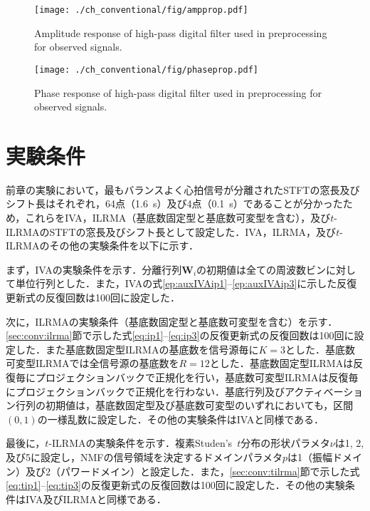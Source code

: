 \begin{figure}[!t]
\centering
\texttt{[image: ./ch\_conventional/fig/ampprop.pdf]}
\caption{Amplitude response of high-pass digital filter used in preprocessing for observed signals.}
\label{fig:ampres}
\end{figure}

\begin{figure}[!t]
\centering
\texttt{[image: ./ch\_conventional/fig/phaseprop.pdf]}
\caption{Phase response of high-pass digital filter used in preprocessing for observed signals.}
\label{fig:phaseres}
\end{figure}

\section{実験条件}
\label{sec:conv:expcond5}

前章の実験において，最もバランスよく心拍信号が分離されたSTFTの窓長及びシフト長はそれぞれ，64点（1.6~s）及び4点（0.1~s）であることが分かったため，これらをIVA，ILRMA（基底数固定型と基底数可変型を含む），及び$t$-ILRMAのSTFTの窓長及びシフト長として設定した．IVA，ILRMA，及び$t$-ILRMAのその他の実験条件を以下に示す．

まず，IVAの実験条件を示す．分離行列$\bm{W}_{i}$の初期値は全ての周波数ビンに対して単位行列とした．また，IVAの式\eqref{ep:auxIVAip1}--\eqref{ep:auxIVAip3}に示した反復更新式の反復回数は100回に設定した．

次に，ILRMAの実験条件（基底数固定型と基底数可変型を含む）を示す．\ref{sec:conv:ilrma}節で示した式\eqref{eq:ip1}--\eqref{eq:ip3}の反復更新式の反復回数は100回に設定した．また基底数固定型ILRMAの基底数を信号源毎に$K=3$とした．基底数可変型ILRMAでは全信号源の基底数を$R=12$とした．基底数固定型ILRMAは反復毎にプロジェクションバックで正規化を行い，基底数可変型ILRMAは反復毎にプロジェクションバックで正規化を行わない．基底行列及びアクティベーション行列の初期値は，基底数固定型及び基底数可変型のいずれにおいても，区間$(0,1)$の一様乱数に設定した．その他の実験条件はIVAと同様である．

最後に，$t$-ILRMAの実験条件を示す．複素Studen's~$t$分布の形状パラメタ$\nu$は1, 2, 及び5に設定し，NMFの信号領域を決定するドメインパラメタ$p$は1（振幅ドメイン）及び2（パワードメイン）と設定した．また，\ref{sec:conv:tilrma}節で示した式\eqref{eq:tip1}--\eqref{eq:tip3}の反復更新式の反復回数は100回に設定した．その他の実験条件はIVA及びILRMAと同様である．


